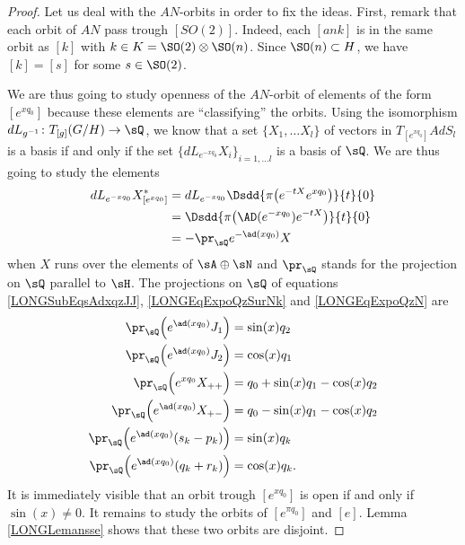 \begin{proof}
	Let us deal with the $AN$-orbits in order to fix the ideas. First, remark that each orbit of $AN$ pass trough $[SO(2)]$. Indeed, each $[ank]$ is in the same orbit as $[k]$ with $k\in K=\SO(2)\otimes\SO(n)$. Since $\SO(n)\subset H$, we have $[k]=[s]$ for some $s\in\SO(2)$.

	We are thus going to study openness of the $AN$-orbit of elements of the form $[e^{x q_0}]$ because these elements are ``classifying'' the orbits. Using the isomorphism $  dL_{g^{-1}}\colon T_{[g]}(G/H)\to \sQ$, we know that a set $\{ X_1,\ldots X_l \}$ of vectors in $T_{[ e^{x q_0}]}AdS_l$ is a basis if and only if the set $\{ dL_{ e^{-xq_0}}X_i \}_{i=1,\ldots l}$ is a basis of $\sQ$. We are thus going to study the elements 
	\begin{equation}
		\begin{aligned}[]
			dL_{ e^{-xq_0}}X^*_{[ e^{xq_0}]}	&=dL_{ e^{-xq_0}}\Dsdd{ \pi\big(  e^{-t X} e^{xq_0} \big) }{t}{0}\\
								&=\Dsdd{ \pi\big(  \AD( e^{-xq_0} ) e^{-tX} \big) }{t}{0}\\
								&=-\pr_{\sQ} e^{-\ad(xq_0)}X
		\end{aligned}
	\end{equation}
    when $X$ runs over the elements of $\sA\oplus \sN$ and $\pr_{\sQ}$ stands for the projection on $\sQ$ parallel to $\sH$.
	The projections on $\sQ$ of equations \eqref{LONGSubEqsAdxqzJJ}, \eqref{LONGEqExpoQzSurNk} and \eqref{LONGEqExpoQzN} are
	\begin{subequations}		\label{LONGSubEqsExpAdxqDivers}
		\begin{align}
			\pr_{\sQ}\Big( e^{\ad(xq_0)}J_1\Big)&=\sin(x)q_2\\
			\pr_{\sQ}\Big( e^{\ad(xq_0)}J_2\Big)&=\cos(x)q_1\\
			\pr_{\sQ}\Big(  e^{xq_0}X_{++} \Big)&=q_0+\sin(x)q_1-\cos(x)q_2\\
			\pr_{\sQ} \Big(   e^{\ad(xq_0)}X_{+-} \Big)&=q_0-\sin(x)q_1-\cos(x)q_2\\
			\pr_{\sQ}\Big(  e^{\ad(xq_0)}(s_k-p_k) \Big)&= \sin(x)q_k\\
			\pr_{\sQ}\Big(  e^{\ad(xq_0)}(q_k+r_k) \Big)&=\cos(x)q_k.
		\end{align}
	\end{subequations}
	It is immediately visible
	that an orbit trough $[ e^{xq_0}]$ is open if and only if $\sin(x)\neq 0$. It remains to study the orbits of $[ e^{\pi q_0}]$ and $[e]$. Lemma \ref{LONGLemansse} shows that these two orbits are disjoint.


\end{proof}

